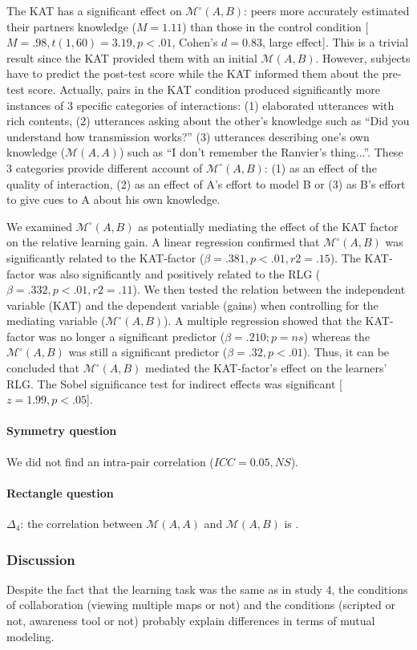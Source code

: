 \documentclass[twocolumn]{article}
\newcommand{\gmodel}[2]{{$\mathcal{M}(#1, #2)$}}
\newcommand{\gModel}[2]{{$\mathcal{M}^{\circ}(#1, #2)$}}
\begin{document}
The KAT has a significant effect on \gModel{A}{B}: peers more accurately
estimated their partners knowledge ($M = 1.11$) than those in the control
condition [$M = .98, t(1, 60) = 3.19, p < .01$, Cohen's $d = 0.83$, large
effect]. This is a trivial result since the KAT provided them with an initial
\gmodel{A}{B}. However, subjects have to predict the post-test score while the
KAT informed them about the pre-test score. Actually, pairs in the KAT condition
produced significantly more instances of 3 specific categories of interactions:
(1) elaborated utterances with rich contents,  (2) utterances asking about the
other's knowledge such as ``Did you understand how transmission works?'' (3)
utterances describing one's own knowledge (\gmodel{A}{A}) such as ``I don't
remember the Ranvier's thing...''. These 3 categories provide different account
of \gModel{A}{B}: (1) as an effect of the quality of interaction, (2) as an
effect of A's effort to model B or (3) as B's effort to give cues to A about his
own knowledge.

We examined \gModel{A}{B} as potentially mediating the effect of the KAT factor
on the relative learning gain. A linear regression confirmed that \gModel{A}{B}
was significantly related to the KAT-factor ($\beta= .381, p < .01, r2 = .15$).
The KAT-factor was also significantly and positively related to the RLG ($\beta=
.332, p < .01, r2 = .11$). We then tested the relation between the independent
variable (KAT) and the dependent variable (gains) when controlling for the
mediating variable (\gModel{A}{B}). A multiple regression showed that the
KAT-factor was no longer a significant predictor ($\beta= .210; p = ns$) whereas
the \gModel{A}{B} was still a significant predictor ($\beta= .32, p < .01$).
Thus, it can be concluded that \gModel{A}{B} mediated the KAT-factor's effect on
the learners' RLG. The Sobel significance test for indirect effects was
significant [$z = 1.99, p < .05$]. 

\paragraph{Symmetry question} We did not find an intra-pair correlation ($ICC =
0.05, NS$).

\paragraph{Rectangle question} $\Delta_4$: the correlation between \gmodel{A}{A} and \gmodel{A}{B} is
.

\subsubsection*{Discussion}

Despite the fact that the learning task was the same as in study 4, the
conditions of collaboration (viewing multiple maps or not) and the conditions
(scripted or not, awareness tool or not) probably explain differences in terms
of mutual modeling.





\end{document}
